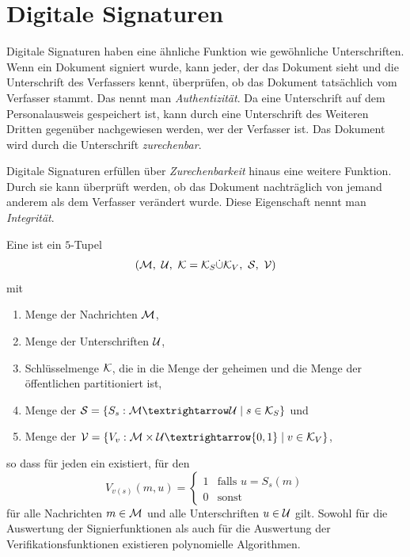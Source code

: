 \section{Digitale Signaturen}

Digitale Signaturen haben eine ähnliche Funktion wie gewöhnliche Unterschriften. Wenn ein Dokument signiert wurde, kann jeder, der das Dokument sieht und die Unterschrift des Verfassers kennt, überprüfen, ob das Dokument tatsächlich vom Verfasser stammt. Das nennt man \emph{Authentizität}. Da eine Unterschrift \zB auf dem Personalausweis gespeichert ist, kann durch eine Unterschrift des Weiteren Dritten gegenüber nachgewiesen werden, wer der Verfasser ist. Das Dokument wird durch die Unterschrift \emph{zurechenbar}.

Digitale Signaturen erfüllen über \emph{Zurechenbarkeit} hinaus eine weitere Funktion. Durch sie kann überprüft werden, ob das Dokument nachträglich von jemand anderem als dem Verfasser verändert wurde. Diese Eigenschaft nennt man \emph{Integrität}. 

\begin{definition}\label{def:digsig}
Eine  ist ein $5$-Tupel 
\[(\mathcal M, \  \mathcal U, \  \mathcal K = \mathcal K_S \dot\cup \mathcal K_V, \  \mathcal S, \  \mathcal V)\]
mit
\begin{enumerate}
 \item Menge der Nachrichten $\mathcal M$, 
 \item Menge der Unterschriften $\mathcal U$,
 \item Schlüsselmenge $\mathcal K$, die in die Menge der geheimen  und die Menge der öffentlichen  partitioniert ist,
 \item Menge der  $\mc S = \{S_s: \mc M → \mc U \mid s \in \mc K_S\}$ und 
 \item Menge der  $\mc V = \{V_v: \mc M \times \mc U → \{0, 1\} \mid v \in \mc K_V\}$,
\end{enumerate}
so dass für jeden  ein  existiert, für den 
\[V_{v(s)}(m, u) = \begin{cases}
			      1 & \text{falls } u = S_s(m)\\
			      0 & \text{sonst}
                   \end{cases}\]
für alle Nachrichten $m \in \mathcal M$ und alle Unterschriften $u \in \mathcal U$ gilt. Sowohl für die Auswertung der Signierfunktionen als auch für die Auswertung der Verifikationsfunktionen existieren polynomielle Algorithmen.
\end{definition}

